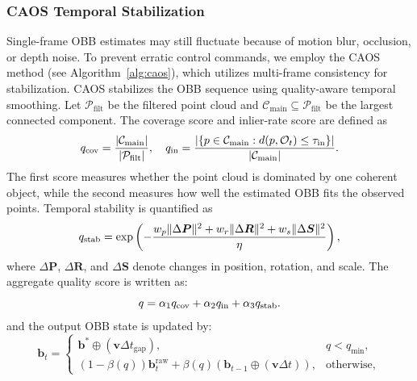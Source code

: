 \subsubsection{CAOS Temporal Stabilization}
Single-frame OBB estimates may still fluctuate because of motion blur, occlusion, or depth noise. To prevent erratic control commands, we employ the CAOS method (see Algorithm~\ref{alg:caos}), which utilizes multi-frame consistency for stabilization. CAOS stabilizes the OBB sequence using quality-aware temporal smoothing.  Let $\mathcal{P}_{\text{filt}}$ be the filtered point cloud and $\mathcal{C}_{\text{main}}\subseteq\mathcal{P}_{\text{filt}}$ be the largest connected component. The coverage score and inlier-rate score are defined as
\begin{equation}
q_{\text{cov}}=\frac{|\mathcal{C}_{\text{\text{main}}}|}{|\mathcal{P}_{\text{\text{filt}}}|},\quad
q_{\text{in}}=\frac{\left|\{p\in\mathcal{C}_{\text{\text{main}}}:d(p,\mathcal{O}_{t})\le\tau_{\text{\text{in}}}\}\right|}{|\mathcal{C}_{\text{\text{main}}}|}.
\label{eq:qcov}
\end{equation}
The first score measures whether the point cloud is dominated by one coherent object, while the second measures how well the estimated OBB fits the observed points. Temporal stability is quantified as
\begin{equation}
q_{\text{\text{stab}}}=\exp\left(-\frac{w_p\|\Delta\boldsymbol{P}\|^2+w_r\|\Delta\boldsymbol{R}\|^2+w_s\|\Delta\boldsymbol{S}\|^2}{\eta}\right),
\label{eq:qstab}
\end{equation}
where $\Delta\boldsymbol{P}$, $\Delta\boldsymbol{R}$, and $\Delta\boldsymbol{S}$ denote changes in position, rotation, and scale. The aggregate quality score is written as:
\begin{equation}
q=\alpha_1q_{\text{cov}}+\alpha_2q_{\text{\text{in}}}+\alpha_3q_{\text{\text{stab}}}.
\end{equation}
and the output OBB state is updated by:
\begin{equation}
\boldsymbol{b}_{t}=\begin{cases}
\boldsymbol{b}^{*}\oplus(\boldsymbol{v}\Delta t_{\text{gap}}), & q<q_{\text{min}},\\
(1-\beta(q))\boldsymbol{b}_{t}^{\text{raw}}+\beta(q)(\boldsymbol{b}_{t-1}\oplus(\boldsymbol{v}\Delta t)), & \mathrm{otherwise},
\end{cases}
\label{eq:caos}
\end{equation}

